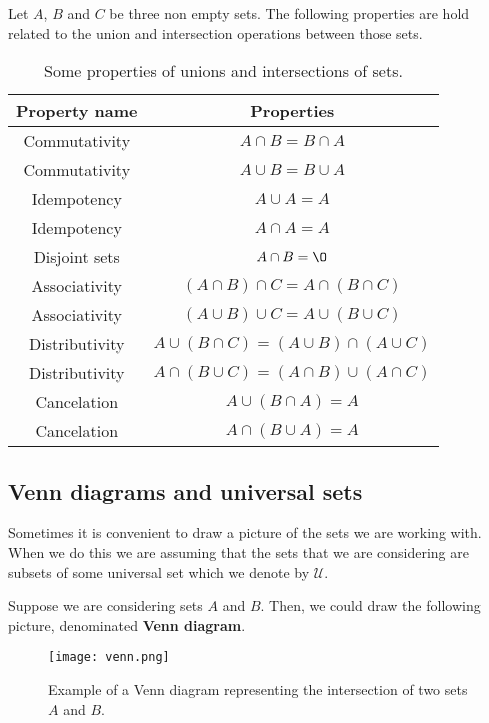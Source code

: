 Let $A$, $B$ and $C$ be three non empty sets. The following properties are hold related to the union and intersection operations between those sets.
\newpage
\bgroup
\def\arraystretch{1.5}
\def\tabcolsep{20}
\begin{table}[h!]
\centering
\begin{tabular}{|c|c|}
    \hline
    \textbf{Property name} & \textbf{Properties} \\
    \hline
    Commutativity & $A\cap B = B\cap A$ \\
    \hline
    Commutativity & $A\cup B = B\cup A$ \\
    \hline
    Idempotency & $A\cup A = A$ \\
    \hline
    Idempotency & $A\cap A = A$ \\
    \hline
    Disjoint sets & $A\cap B = \O$ \\
    \hline
    Associativity & $\left( A\cap B \right)\cap C = A\cap\left( B\cap C \right)$ \\
    \hline
    Associativity & $\left( A\cup B \right)\cup C = A\cup\left( B\cup C \right)$ \\
    \hline
    Distributivity & $A\cup\left( B\cap C\right) = \left( A\cup B \right)\cap\left( A\cup C \right)$ \\
    \hline
    Distributivity & $A\cap\left( B\cup C\right) = \left( A\cap B \right)\cup\left( A\cap C \right)$ \\
    \hline
    Cancelation & $A\cup\left( B\cap A \right) = A$ \\
    \hline
    Cancelation & $A\cap\left( B\cup A \right) = A$ \\
    \hline
\end{tabular}
\caption{Some properties of unions and intersections of sets.}
\end{table}
\egroup

\subsection{Venn diagrams and universal sets}
Sometimes it is convenient to draw a picture of the sets we are working with. When we do this we are assuming that the sets that we are considering are subsets of some universal set which we denote by $\mathcal{U}$.

Suppose we are considering sets $A$ and $B$. Then, we could draw the following picture, denominated \textbf{Venn diagram}.
\begin{figure}[htbp]
    \centerline{\texttt{[image: venn.png]}}
    \caption{Example of a Venn diagram representing the intersection of two sets $A$ and $B$.}
\end{figure}

